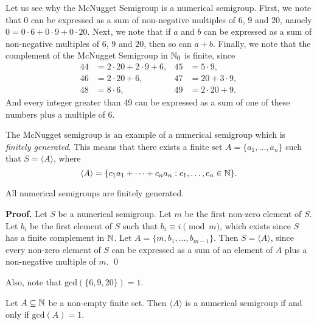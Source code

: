 Let us see why the McNugget Semigroup is a numerical semigroup. First, we note that $0$ can be expressed as a sum of non-negative multiples of 6, 9 and 20, namely $0 = 0 \cdot 6 + 0 \cdot 9 + 0 \cdot 20$. Next, we note that if $a$ and $b$ can be expressed as a sum of non-negative multiples of 6, 9 and 20, then so can $a + b$. Finally, we note that the complement of the McNugget Semigroup in $\mathbb{N}_0$ is finite, since 
\begin{align*}
    44 &= 2 \cdot 20 + 2 \cdot 9 + 6, &45 &= 5 \cdot 9,\\
    46 &= 2 \cdot 20 + 6, &47 &= 20 + 3 \cdot 9,\\
    48 &= 8 \cdot 6, & 49&= 2 \cdot 20 + 9. 
\end{align*}
And every integer greater than 49 can be expressed as a sum of one of these numbers plus a multiple of 6. \par
The McNugget semigroup is an example of a numerical semigroup which is \textit{finitely generated}. This means that there exists a finite set $A = \{a_1, \ldots, a_n\}$ such that $S = \langle A \rangle$, where 
\[\langle A \rangle = \{c_1a_1 + \cdots + c_na_n : c_1, \ldots, c_n \in \mathbb{N}\}.\]  
\begin{theorem}\label{thm:smgps:fin_gen}
    All numerical semigroups are finitely generated.
\end{theorem}

\textbf{Proof. } Let $S$ be a numerical semigroup. Let $m$ be the first non-zero element of $S$. Let $b_i$ be the first element of $S$ such that \(b_i \equiv i \pmod m\), which exists since $S$ has a finite complement in $\mathbb{N}$. Let $A = \{m, b_{1}, \ldots, b_{m - 1}\}$. Then $S = \langle A \rangle$, since every non-zero element of $S$ can be expressed as a sum of an element of $A$ plus a non-negative multiple of $m$. \qed \par

Also, note that $\mathrm{gcd}(\{6, 9, 20\}) =  1$.

\begin{theorem}\label{thm:smgps:gcd}
    Let $A \subseteq \mathbb{N}$ be a non-empty finite set. Then $\langle A \rangle$ is a numerical semigroup if and only if $\mathrm{gcd}(A) = 1$.    
\end{theorem}


